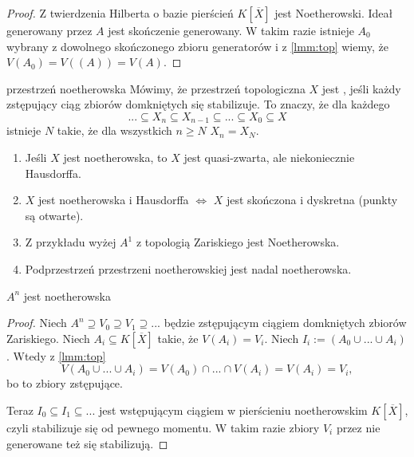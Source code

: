 \begin{proof}
  Z twierdzenia Hilberta o bazie pierścień $K[\overline{X}]$ jest Noetherowski. Ideał generowany przez $A$ jest skończenie generowany. W takim razie istnieje $A_0$ wybrany z dowolnego skończonego zbioru generatorów i z \ref{lmm:top} wiemy, że $V(A_0)=V((A))=V(A)$.
\end{proof}

\begin{definition}{przestrzeń noetherowska}{}
  Mówimy, że przestrzeń topologiczna $X$ jest , jeśli każdy zstępujący ciąg zbiorów domkniętych się stabilizuje. To znaczy, że dla każdego
  $$...\subseteq X_n\subseteq X_{n-1}\subseteq...\subseteq X_0\subseteq X$$
  istnieje $N$ takie, że dla wszystkich $n\geq N$ $X_n=X_N$.
\end{definition}

\begin{remark}{}{}
  \begin{enumerate}
    \item  Jeśli $X$ jest noetherowska, to $X$ jest quasi-zwarta, ale niekoniecznie Hausdorffa.
    \item $X$ jest noetherowska i Hausdorffa $\iff$ $X$ jest skończona i dyskretna (punkty są otwarte).
    \item Z przykładu wyżej $A^1$ z topologią Zariskiego jest Noetherowska.
    \item Podprzestrzeń przestrzeni noetherowskiej jest nadal noetherowska.
  \end{enumerate}
\end{remark}

\begin{proposition}{}{}
  $A^n$ jest noetherowska 
\end{proposition}

\begin{proof}
  Niech $A^n\supseteq V_0\supseteq V_1\supseteq...$ będzie zstępującym ciągiem domkniętych zbiorów Zariskiego. Niech $A_i\subseteq K[\overline{X}]$ takie, że $V(A_i)=V_i$. Niech $I_i:=(A_0\cup...\cup A_i)$. Wtedy z \ref{lmm:top} 
  $$V(A_0\cup...\cup A_i)=V(A_0)\cap ...\cap V(A_i) = V(A_i)=V_i,$$
  bo to zbiory zstępujące.

  Teraz $I_0\subseteq I_1\subseteq ...$ jest wstępującym ciągiem w pierścieniu noetherowskim $K[\overline{X}]$, czyli stabilizuje się od pewnego momentu. W takim razie zbiory $V_i$ przez nie generowane też się stabilizują.
\end{proof}

